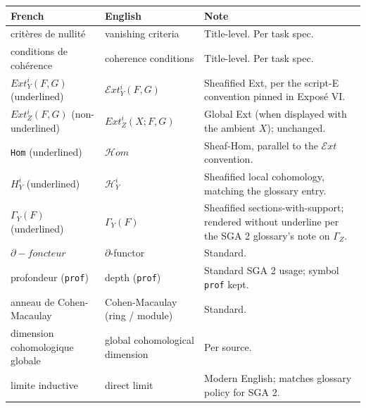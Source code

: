 \documentclass[
  11pt,
  a4paper,
]{book}
\newcounter{none} %
\begin{document}
{\def\LTcaptype{none} %
\begin{longtable}[]{@{}
  >{\raggedright\arraybackslash}p{}
  >{\raggedright\arraybackslash}p{}
  >{\raggedright\arraybackslash}p{}@{}}
\toprule\noalign{}
\begin{minipage}[b]{\linewidth}\raggedright
French
\end{minipage} & \begin{minipage}[b]{\linewidth}\raggedright
English
\end{minipage} & \begin{minipage}[b]{\linewidth}\raggedright
Note
\end{minipage} \\
\midrule\noalign{}
\endhead
\bottomrule\noalign{}
\endlastfoot
critères de nullité & vanishing criteria & Title-level. Per task
spec. \\
conditions de cohérence & coherence conditions & Title-level. Per task
spec. \\
\(Ext^{i}_{Y}(F, G)\) (underlined) & \(\mathcal{E}xt^{i}_{Y}(F, G)\) &
Sheafified Ext, per the script-E convention pinned in Exposé VI. \\
\(Ext^{i}_{Z}(F, G)\) (non-underlined) & \(Ext^{i}_{Z}(X; F, G)\) &
Global Ext (when displayed with the ambient \(X\)); unchanged. \\
\texttt{Hom} (underlined) & \(\mathcal{H}om\) & Sheaf-Hom, parallel to
the \(\mathcal{E}xt\) convention. \\
\(H^{i}_{Y}\) (underlined) & \(\mathcal{H}^{i}_{Y}\) & Sheafified local
cohomology, matching the glossary entry. \\
\(\Gamma_{Y}(F)\) (underlined) & \(\Gamma_{Y}(F)\) & Sheafified
sections-with-support; rendered without underline per the SGA 2
glossary's note on \(\Gamma_{Z}\). \\
\(\partial-foncteur\) & \(\partial\)-functor & Standard. \\
profondeur (\texttt{prof}) & depth (\texttt{prof}) & Standard SGA 2
usage; symbol \texttt{prof} kept. \\
anneau de Cohen-Macaulay & Cohen-Macaulay (ring / module) & Standard. \\
dimension cohomologique globale & global cohomological dimension & Per
source. \\
limite inductive & direct limit & Modern English; matches glossary
policy for SGA 2. \\

\end{longtable}}
\end{document}
